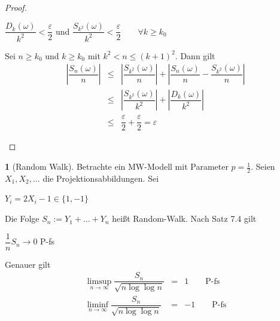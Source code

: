 \documentclass[10pt,a4paper]{report}
\numberwithin{equation}{section}
\numberwithin{figure}{section}
\theoremstyle{plain}
\theoremstyle{definition}
\newtheorem{example}[thm]{\protect\examplename}
\theoremstyle{remark}
\theoremstyle{plain}
\providecommand{\examplename}{Beispiel}
\newcommand{\1}{ \mathbb{1} } %
\begin{document}
\begin{proof}
\begin{itemize}
    \begin{center}
      $\dfrac{D_k(\omega)}{k^2} < \dfrac{\varepsilon}{2}$ und
      $\dfrac{S_{k^2}(\omega)}{k^2} < \dfrac{\varepsilon}{2} \qquad
      \forall k\geq k_0$
    \end{center}
    Sei $n \geq k_0$ und $k\geq k_0$ mit $k^2<n\leq (k+1)^2$. Dann
    gilt
    \begin{eqnarray*}
      \left|\dfrac{S_n(\omega)}{n} \right| &\leq & \left|\dfrac{S_{k^2}(\omega)}{n} \right|+\left|\dfrac{S_n(\omega)}{n}-\dfrac{S_{k^2}(\omega)}{n} \right| \\
      &\leq &\left|\dfrac{S_{k^2}(\omega)}{k^2} \right|+\left|\dfrac{D_{k}(\omega)}{k^2} \right|\\
      &\leq &\dfrac{\varepsilon}{2}+\dfrac{\varepsilon}{2} =\varepsilon
    \end{eqnarray*}
  \end{itemize}
\end{proof}
\begin{example}[Random Walk] 
  Betrachte ein MW-Modell mit Parameter $p=\frac{1}{2}$. Seien
  $X_1,X_2,\ldots$ die Projektionsabbildungen. Sei
  \begin{center}
    $Y_i=2X_i-1 \in \{1,-1\}$
  \end{center}
  Die Folge $S_n:=Y_1+\ldots+Y_n$ heißt Random-Walk. Nach Satz 7.4
  gilt
  \begin{center}
    $\dfrac{1}{n}S_n \to 0$ P-fs
  \end{center}
  Genauer gilt
  \begin{eqnarray*}
    \limsup\limits_{n \to\infty}\dfrac{S_n}{\sqrt{n\log\log n}}&=& 1 \qquad \text{P-fs}\\
    \liminf\limits_{n \to\infty}\dfrac{S_n}{\sqrt{n\log\log n}}&=& -1 \qquad \text{P-fs}
  \end{eqnarray*}
\end{example}
\end{document}
